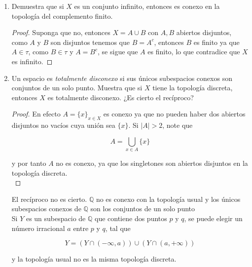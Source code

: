 \documentclass[11pt]{article}
\begin{document}
\begin{enumerate}
    \begin{proof}
        Note que $$A\cup \bigcup_{\alpha}A_{\alpha}=\bigcup_{\alpha}(A\cup A_{\alpha})$$

        y como $A\subset \displaystyle \bigcap_{\alpha}(A\cup A_{\alpha}) 
            $, y $A\neq \emptyset$, entonces por el punto anterior se concluye lo deseado.
    \end{proof}
    
    \item Demuestra que si $X$ es un conjunto infinito, entonces es conexo en la topología del complemento finito.

    \begin{proof}
        Suponga que no, entonces $X=A\cup B$ con $A,B$ abiertos disjuntos, como $A$ y $B$ son disjuntos tenemos que $B=A^{c}$, entonces $B$ es finito ya que $A\in \tau$, como $B\in \tau$ y $A=B^{c}$, se sigue que $A$ es finito, lo que contradice que $X$ es infinito.
    \end{proof}
    
    \item Un espacio es \textit{totalmente disconexo} si sus únicos subespacios conexos son conjuntos de un solo punto. Muestra que si $X$ tiene la topología discreta, entonces $X$ es totalmente disconexo. ¿Es cierto el recíproco?

    \begin{proof}
        En efecto $A=\{x\}_{x\in X}$ es conexo ya que no pueden haber dos abiertos disjuntos no vacíos cuya unión sea $\{x\}$. Si $|A|>2$, note que 

        $$A=\bigcup_{x\in A}\{x\}
            $$

        y por tanto $A$ no es conexo, ya que los singletones son abiertos disjuntos en la topología discreta.\\
    \end{proof}
    
    El recíproco no es cierto. $\mathbb{Q}$ no es conexo con la topología usual y los únicos subespacios conexos de $\mathbb{Q}$ son los conjuntos de un solo punto\\

    Si $Y$ es un subespacio de $\mathbb{Q}$ que contiene dos puntos $p$ y $q$, se puede elegir un número irracional $a$ entre $p$ y $q$, tal que

$$
Y=(Y \cap (-\infty, a)) \cup  (Y \cap (a, +\infty))
$$

y la topología usual  no es la misma topología discreta.


\end{enumerate}
\end{document}
